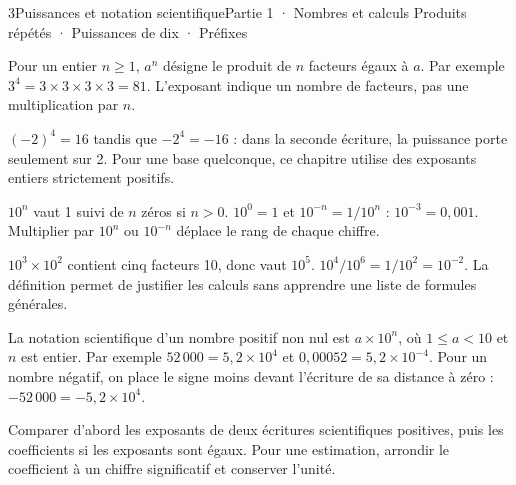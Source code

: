 \begin{ouverture}[calcul]{3}{Puissances et notation scientifique}{Partie 1 · Nombres et calculs}
{Produits répétés · Puissances de dix · Préfixes}
\end{ouverture}
\pagestyle{otMain}\essentiel\fontsize{11}{15}\selectfont
{}\label{cours-3-1}
\begin{definition}Pour un entier $n\ge1$, $a^n$ désigne le produit de $n$ facteurs égaux à $a$. Par exemple $3^4=3\times3\times3\times3=81$. L’exposant indique un nombre de facteurs, pas une multiplication par $n$.\end{definition}
\begin{exemple}$(-2)^4=16$ tandis que $-2^4=-16$ : dans la seconde écriture, la puissance porte seulement sur 2. Pour une base quelconque, ce chapitre utilise des exposants entiers strictement positifs.\end{exemple}
\begin{definition}$10^n$ vaut 1 suivi de $n$ zéros si $n>0$. $10^0=1$ et $10^{-n}=1/10^n$ : $10^{-3}=0{,}001$. Multiplier par $10^n$ ou $10^{-n}$ déplace le rang de chaque chiffre.\end{definition}
\begin{savoirfaire}$10^3\times10^2$ contient cinq facteurs 10, donc vaut $10^5$. $10^4/10^6=1/10^2=10^{-2}$. La définition permet de justifier les calculs sans apprendre une liste de formules générales.\end{savoirfaire}
\clearpage
{}\label{cours-3-2}
\begin{definition}La notation scientifique d’un nombre positif non nul est $a\times10^n$, où $1\le a<10$ et $n$ est entier. Par exemple $52\,000=5{,}2\times10^4$ et $0{,}00052=5{,}2\times10^{-4}$. Pour un nombre négatif, on place le signe moins devant l’écriture de sa distance à zéro : $-52\,000=-5{,}2\times10^4$.\end{definition}
\begin{savoirfaire}[Comparer]Comparer d’abord les exposants de deux écritures scientifiques positives, puis les coefficients si les exposants sont égaux. Pour une estimation, arrondir le coefficient à un chiffre significatif et conserver l’unité.\end{savoirfaire}
